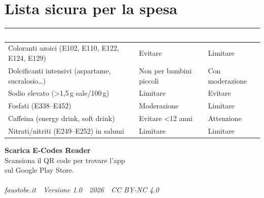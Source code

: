 \documentclass[a5paper,12pt,oneside,openany]{book}
\begin{document}
\section{Lista sicura per la spesa}

{\small
\begin{tabularx}{\textwidth}{|L|L|L|}
\hline
{}
\textcolor{white}{\textbf{Additivo/Ingrediente}}
  & \textcolor{white}{\textbf{Bambini}}
  & \textcolor{white}{\textbf{Anziani}} \\
\hline
Coloranti azoici (E102, E110, E122, E124, E129) & Evitare & Limitare \\
\hline
Dolcificanti intensivi (aspartame, sucralosio\ldots) & Non per bambini piccoli & Con moderazione \\
\hline
Sodio elevato (\textgreater1,5\,g sale/100\,g) & Limitare & Evitare \\
\hline
Fosfati (E338--E452) & Moderazione & Limitare \\
\hline
Caffeina (energy drink, soft drink) & Evitare \textless12 anni & Attenzione \\
\hline
Nitrati/nitriti (E249--E252) in salumi & Limitare & Limitare \\
\hline
\end{tabularx}
}

\cleardoublepage
\thispagestyle{empty}
\begin{center}
\vspace*{3cm}
{\large\bfseries\color{verdescuro} Scarica E-Codes Reader}\\[0.8cm]
{\normalsize Scansiona il QR code per trovare l'app\\
sul Google Play Store.}\\[1.5cm]
\\[1.5cm]
\textcolor{grigioscuro}{\footnotesize\textit{faustobe.it\ \textbullet\ Versione 1.0\ \textbullet\ 2026\ \textbullet\ CC BY-NC 4.0}}
\end{center}
\end{document}

